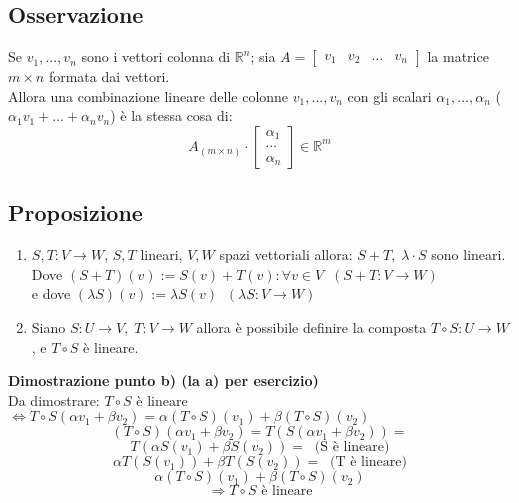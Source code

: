 \subsection{Osservazione}
Se $v_1,...,v_n$ sono i vettori colonna di $\mathbb{R}^n$; sia $A=\begin{bmatrix}v_1&v_2&\dots&v_n\end{bmatrix}$ la matrice $m\times n$ formata dai vettori.
\\Allora una combinazione lineare delle colonne $v_1,...,v_n$ con gli scalari $\alpha_1,...,\alpha_n$ ($\alpha_1v_1+...+\alpha_nv_n$) è la stessa cosa di:
\[A_{(m\times n)}\cdot\begin{bmatrix}\alpha_1\\\cdots\\\alpha_n\end{bmatrix}\in\mathbb{R}^m\]

\subsection{Proposizione}
\begin{enumerate}[label=\alph*)]
	\item $S,T:V\rightarrow W$, $S,T$ lineari, $V,W$ spazi vettoriali allora:
	$S+T,\;\lambda\cdot S$ sono lineari.
	\\Dove $(S+T)(v):=S(v)+T(v):\forall v\in V\;\;(S+T:V\rightarrow W)$
	\\e dove $(\lambda S)(v):=\lambda S(v)\;\;(\lambda S:V\rightarrow W)$

	\item Siano $S:U\rightarrow V,\;T:V\rightarrow W$ allora è possibile definire la composta $T\circ S:U\rightarrow W$, e $T\circ S$ è lineare.
\end{enumerate}
\textbf{Dimostrazione punto b) (la a) per esercizio)}
\\Da dimostrare: $T\circ S$ è lineare $\Leftrightarrow T\circ S(\alpha v_1+\beta v_2)=\alpha(T\circ S)(v_1)+\beta(T\circ S)(v_2)$
\[(T\circ S)(\alpha v_1+\beta v_2)=T(S(\alpha v_1+\beta v_2))=\]
\[T(\alpha S(v_1)+\beta S(v_2))=\;\;\text{(S è lineare)}\]
\[\alpha T(S(v_1))+\beta T(S(v_2))=\;\;\text{(T è lineare)}\]
\[\alpha (T\circ S)(v_1)+\beta(T\circ S)(v_2)\]
\[\Rightarrow T\circ S\text{ è lineare}\]

